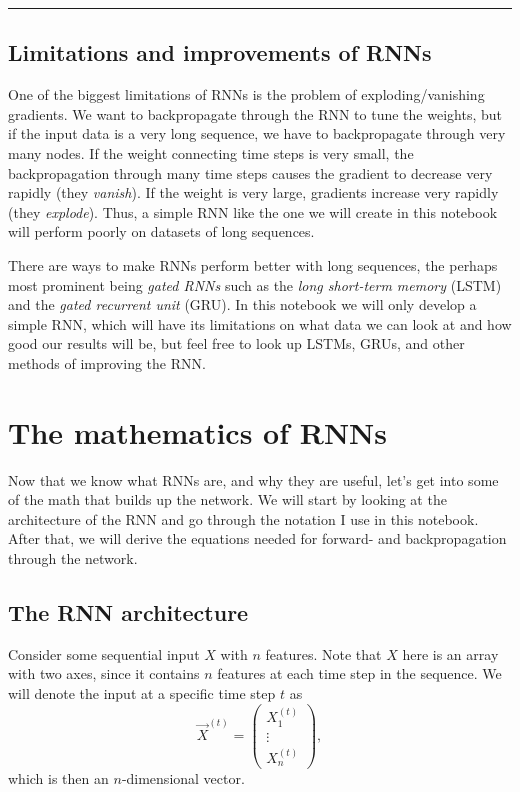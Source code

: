 \documentclass[11pt]{article}
\begin{document}
\begin{center}\rule{0.5\linewidth}{0.5pt}\end{center}

    \subsection{Limitations and improvements of
RNNs}\label{limitations-and-improvements-of-rnns}

    One of the biggest limitations of RNNs is the problem of
exploding/vanishing gradients. We want to backpropagate through the RNN
to tune the weights, but if the input data is a very long sequence, we
have to backpropagate through very many nodes. If the weight connecting
time steps is very small, the backpropagation through many time steps
causes the gradient to decrease very rapidly (they \emph{vanish}). If
the weight is very large, gradients increase very rapidly (they
\emph{explode}). Thus, a simple RNN like the one we will create in this
notebook will perform poorly on datasets of long sequences.

There are ways to make RNNs perform better with long sequences, the
perhaps most prominent being \emph{gated RNNs} such as the \emph{long
short-term memory} (LSTM) and the \emph{gated recurrent unit} (GRU). In
this notebook we will only develop a simple RNN, which will have its
limitations on what data we can look at and how good our results will
be, but feel free to look up LSTMs, GRUs, and other methods of improving
the RNN.

    \section{The mathematics of RNNs}\label{the-mathematics-of-rnns}

    Now that we know what RNNs are, and why they are useful, let's get into
some of the math that builds up the network. We will start by looking at
the architecture of the RNN and go through the notation I use in this
notebook. After that, we will derive the equations needed for forward-
and backpropagation through the network.

    \subsection{The RNN architecture}\label{the-rnn-architecture}

    Consider some sequential input \(X\) with \(n\) features. Note that
\(X\) here is an array with two axes, since it contains \(n\) features
at each time step in the sequence. We will denote the input at a
specific time step \(t\) as \[\vec{X}^{(t)} = \begin{pmatrix}
X^{(t)}_1 \\ \vdots \\ X^{(t)}_n
\end{pmatrix},\] which is then an \(n\)-dimensional vector.
\end{document}
